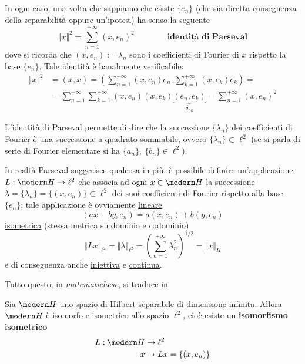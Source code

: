 In ogni caso, una volta che sappiamo che esiste $\{e_n\}$ (che sia diretta conseguenza della separabilità oppure un'ipotesi) ha senso la seguente
$$
\Vert x\Vert^2=\sum_{n=1}^{+\infty} (x,e_n)^2 \qquad\qquad  \textbf{identità di Parseval}
$$
dove si ricorda che $(x,e_n):=\lambda_n$ sono i coefficienti di Fourier di $x$ rispetto la base $\{e_n\}$. Tale identità è banalmente verificabile:
\begin{align*}
\Vert x \Vert^2&=(x,x)=\left(\sum_{n=1}^{+\infty}(x,e_n)e_n,\sum_{k=1}^{+\infty}(x,e_k)e_k\right)=\\
&=\sum_{n=1}^{+\infty}\sum_{k=1}^{+\infty} (x,e_n)(x,e_k)\underbrace{(e_n,e_k)}_{\delta_{nk}}=\sum_{n=1}^{+\infty} (x,e_n)^2
\end{align*}

L'identità di Parseval permette di dire che la successione $\{\lambda_n\}$ dei coefficienti di Fourier è una successione a quadrato sommabile, ovvero $\{\lambda_n\}\subset \ell^2$ (se si parla di serie di Fourier elementare si ha $\{a_n\},\ \{b_n\}\in\ell^2$).

In realtà Parseval suggerisce qualcosa in più: è possibile definire un'applicazione $L:\Hc\to\ell^2$ che associa ad ogni $x\in \Hc$ la successione $\lambda=\{\lambda_n\}=\{(x,e_n)\}\subset\ell^2$ dei suoi coefficienti di Fourier rispetto alla base $\{e_n\}$; tale applicazione è ovviamente \underline{lineare}
$$
(ax+by,e_n)=a(x,e_n)+b(y,e_n)
$$
\underline{isometrica} (stessa metrica su dominio e codominio)
$$
\Vert Lx \Vert_{\ell^2}=\Vert \lambda \Vert_{\ell^2}=\left(\sum_{n=1}^{+\infty}\lambda_n^2\right)^{1/2} =\Vert x \Vert_H
$$
e di conseguenza anche \underline{iniettiva} e \underline{continua}. 

Tutto questo, in \textit{matematichese}, si traduce in
\begin{thm}
Sia $\Hc$ uno spazio di Hilbert separabile di dimensione infinita. Allora $\Hc$ è isomorfo e isometrico allo spazio $\ell^2$, cioè esiste un \textbf{isomorfismo isometrico}
\begin{align*}
L:\Hc&\to\ell^2 \\
x&\mapsto Lx=\{(x,e_n)\}
\end{align*}
\end{thm} 

